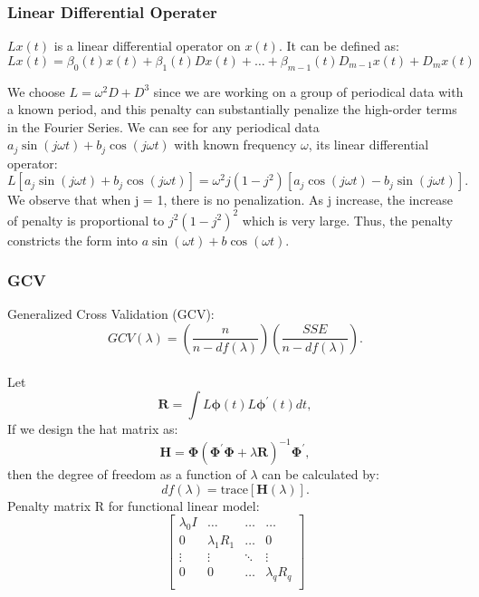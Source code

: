 \documentclass[
	9pt, %
]{beamer}
\begin{document}

\begin{frame}
	\frametitle{Linear Differential Operater}
	$Lx(t)$ is a linear differential operator on $x(t)$. It can be defined as:
	$$
	Lx(t) = \beta_0(t)x(t) + \beta_1(t)Dx(t) +\dots + \beta_{m-1}(t)D_{m-1}x(t) +D_mx(t)
	$$

We choose $L=\omega^2D+D^3$ since we are working on a group of periodical data with a known period, and this penalty can substantially penalize the high-order terms in the Fourier Series. We can see for any periodical data $a_{j}\sin(j\omega t)+b_{j}\cos(j\omega t)$ with known frequency $\omega$, its linear differential operator: 
$$L\left[a_j\sin{\left(j\omega t\right)}+b_j\cos{\left(j\omega t\right)}\right]=\omega^2j\left(1-j^2\right)\left[a_j\cos{\left(j\omega t\right)}-b_j\sin{\left(j\omega t\right)}\right].$$
We observe that when j = 1, there is no penalization. As j increase, the increase of penalty is proportional to $j^2 (1-j^2)^2$ which is very large. Thus, the penalty constricts the form into $a\sin(\omega t) + b\cos(\omega t)$.
	

\end{frame}
\begin{frame}
	\frametitle{GCV}
	Generalized Cross Validation (GCV):
	$$GCV\left(\lambda\right)=\left(\frac{n}{n-df\left(\lambda\right)}\right)\left(\frac{SSE}{n-df(\lambda)}\right).$$\\
	Let
	$$\bm{R}=\int{L\bm{\phi}\left(t\right)L\bm{\phi}^\prime\left(t\right)dt},$$ 
	If we design the hat matrix as:
	$$\bm{H}=\bm{\Phi}\left(\bm{\Phi}^\prime\bm{\Phi}+\lambda\bm{R}\right)^{-1}\bm{\Phi}^\prime,$$
	then the degree of freedom as a function of $\lambda$ can be calculated by: 
	$$df\left(\lambda\right)=\mathrm{trace}\left[\bm{H}\left(\lambda\right)\right].$$
	Penalty matrix R for functional linear model:
	$$\left[\begin{matrix}\lambda_0 I &\ldots&\ldots&\ldots\\0&\lambda_1R_1&\ldots&0\\\vdots&\vdots&\ddots&\vdots\\0&0&\ldots&\lambda_qR_q\\\end{matrix}\right]$$
\end{frame}
\end{document}
